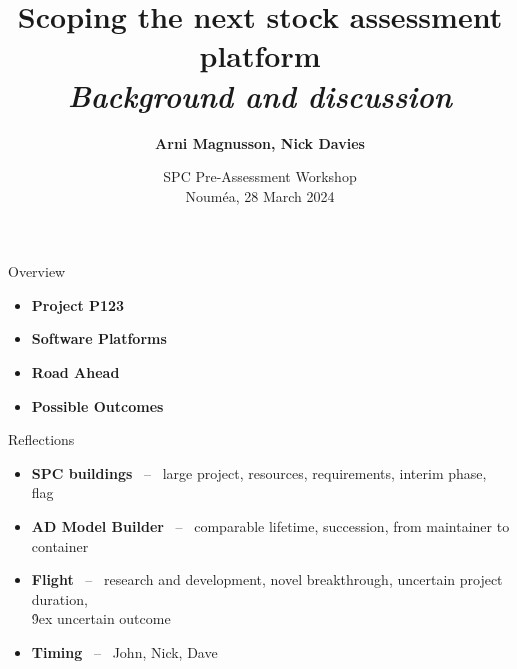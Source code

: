 \documentclass[aspectratio=169]{beamer}
\begin{document}
\begin{frame}
  \title{\vspace{-5ex}\darkblue Scoping the next stock assessment
    platform\\[2ex]
    \it\large\darkgray Background and discussion}
  \author{\vspace{-10ex}\darkgray\bf
    Arni Magnusson, Nick Davies}
  \date{\darkgreen SPC Pre-Assessment Workshop\\[0.5ex]
    Nouméa, 28 March 2024}
  \titlepage
\end{frame}


\begin{frame}{Overview}
  \begin{itemize}
    \item[] {\bf\darkblue Project P123} \\[5ex]
    \item[] {\bf\darkblue Software Platforms} \\[5ex]
    \item[] {\bf\darkblue Road Ahead} \\[5ex]
    \item[] {\bf\darkblue Possible Outcomes} \\[1ex]
  \end{itemize}
\end{frame}


\begin{frame}{Reflections}\small
  \begin{itemize}
    \item[] {\bf SPC buildings} ~--~ large project, resources, requirements,
    interim phase, flag\\[5ex]
    \item[] {\bf AD Model Builder} ~--~ comparable lifetime, succession,
    from maintainer to container\\[5ex]
    \item[] {\bf Flight} ~--~ research and development, novel breakthrough,
    uncertain project duration,\\[0.5ex]
    \h{9ex} uncertain outcome\\[5ex]
    \item[] {\bf Timing} ~--~ John, Nick, Dave\\[3ex]
  \end{itemize}
\end{frame}
\end{document}
